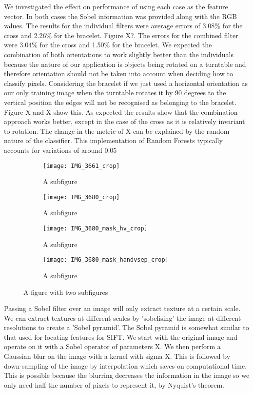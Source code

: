 \documentclass[12pt]{IIBproject}
\begin{document}
We investigated the effect on performance of using each case as the feature vector. In both cases the Sobel information was provided along with the RGB values. The results for the individual filters were average errors of 3.08\% for the cross and 2.26\% for the bracelet. Figure X?. The errors for the combined filter were 3.04\% for the cross and 1.50\% for the bracelet. We expected the combination of both orientations to work slightly better than the individuals because the nature of our application is objects being rotated on a turntable and therefore orientation should not be taken into account when deciding how to classify pixels. Considering the bracelet if we just used a horizontal orientation as our only training image when the turntable rotates it by 90 degrees to the vertical position the edges will not be recognised as belonging to the bracelet. Figure X and X show this. As expected the results show that the combination approach works better, except in the case of the cross as it is relatively invariant to rotation. The change in the metric of X can be explained by the random nature of the classifier. This implementation of Random Forests typically accounts for variations of around 0.05%
\begin{figure}[H]
\centering
\begin{subfigure}{.45\textwidth}
  \centering
  \texttt{[image: IMG\_3661\_crop]}
  \caption{A subfigure}
  \label{fig:sub2}
\end{subfigure}
\begin{subfigure}{.45\textwidth}
  \centering
  \texttt{[image: IMG\_3680\_crop]}
  \caption{A subfigure}
  \label{fig:sub2}
\end{subfigure}
\begin{subfigure}{.45\textwidth}
  \centering
  \texttt{[image: IMG\_3680\_mask\_hv\_crop]}
  \caption{A subfigure}
  \label{fig:sub1}
\end{subfigure}%
\begin{subfigure}{.45\textwidth}
  \centering
  \texttt{[image: IMG\_3680\_mask\_handvsep\_crop]}
  \caption{A subfigure}
  \label{fig:sub2}
\end{subfigure}

\caption{A figure with two subfigures}
\label{fig:test}
\end{figure}

Passing a Sobel filter over an image will only extract texture at a certain scale. We can extract textures at different scales by 'sobelising' the image at different resolutions to create a 'Sobel pyramid'. The Sobel pyramid is somewhat similar to that used for locating features for SIFT\cite{lowe1999object}. We start with the original image and operate on it with a Sobel operator of parameters X. We then perform a Gaussian blur on the image with a kernel with sigma X. This is followed by down-sampling of the image by interpolation which saves on computational time. This is possible because the blurring decreases the information in the image so we only need half the number of pixels to represent it, by Nyquist's theorem.
\end{document}
